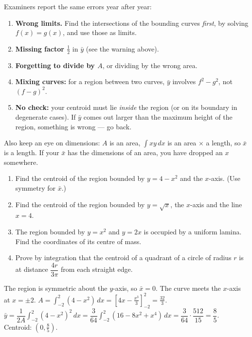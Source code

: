 \documentclass[11pt]{article}
\begin{document}
\begin{attention}
Examiners report the same errors year after year:
\begin{enumerate}
\item \textbf{Wrong limits.} Find the intersections of the bounding curves \emph{first}, by solving $f(x) = g(x)$, and use those as limits.
\item \textbf{Missing factor $\tfrac12$} in $\bar{y}$ (see the warning above).
\item \textbf{Forgetting to divide by $A$}, or dividing by the wrong area.
\item \textbf{Mixing curves:} for a region between two curves, $\bar{y}$ involves $f^2 - g^2$, not $(f-g)^2$.
\item \textbf{No check:} your centroid must lie \emph{inside} the region (or on its boundary in degenerate cases). If $\bar{y}$ comes out larger than the maximum height of the region, something is wrong — go back.
\end{enumerate}
Also keep an eye on dimensions: $A$ is an area, $\int xy\,dx$ is an area $\times$ a length, so $\bar{x}$ is a length. If your $\bar{x}$ has the dimensions of an area, you have dropped an $x$ somewhere.
\end{attention}

\begin{exercice}[Practice]
\begin{enumerate}
\item Find the centroid of the region bounded by $y = 4 - x^2$ and the $x$-axis. (Use symmetry for $\bar{x}$.)
\item Find the centroid of the region bounded by $y = \sqrt{x}$, the $x$-axis and the line $x = 4$.
\item The region bounded by $y = x^2$ and $y = 2x$ is occupied by a uniform lamina. Find the coordinates of its centre of mass.
\item Prove by integration that the centroid of a quadrant of a circle of radius $r$ is at distance $\dfrac{4r}{3\pi}$ from each straight edge.
\end{enumerate}
\end{exercice}

\begin{corrige}[Exercise 1]
The region is symmetric about the $y$-axis, so $\bar{x} = 0$. The curve meets the $x$-axis at $x = \pm 2$.
$A = \displaystyle\int_{-2}^{2}(4-x^2)\,dx = \left[4x - \tfrac{x^3}{3}\right]_{-2}^{2} = \tfrac{32}{3}$.
$\bar{y} = \dfrac{1}{2A}\displaystyle\int_{-2}^{2}(4-x^2)^2\,dx = \dfrac{3}{64}\int_{-2}^{2}(16 - 8x^2 + x^4)\,dx = \dfrac{3}{64}\cdot\dfrac{512}{15} = \dfrac{8}{5}$.
Centroid: $\left(0, \tfrac{8}{5}\right)$.
\end{corrige}
\end{document}
